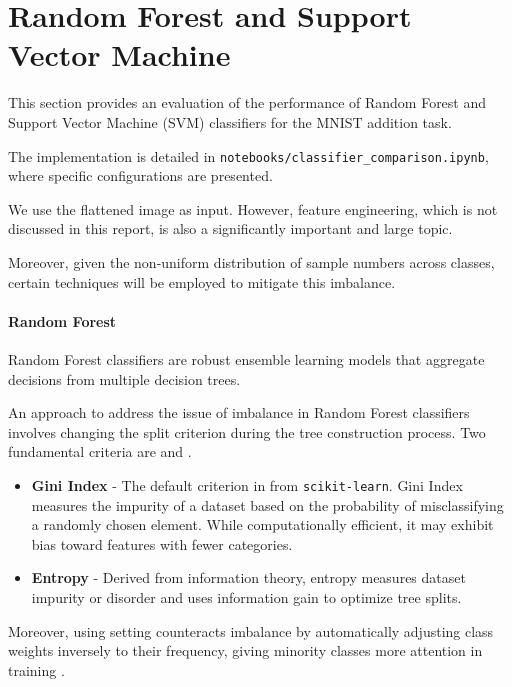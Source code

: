 \documentclass{article}
\begin{document}
\newpage

\section{Random Forest and Support Vector Machine}

This section provides an evaluation of the performance of Random Forest and Support Vector Machine (SVM) classifiers for the MNIST addition task.

The implementation is detailed in \texttt{notebooks/classifier\_comparison.ipynb}, where specific configurations are presented.

We use the flattened image as input. However, feature engineering, which is not discussed in this report, is also a significantly important and large topic. 

Moreover, given the non-uniform distribution of sample numbers across classes, certain techniques will be employed to mitigate this imbalance.

\paragraph{Random Forest}

Random Forest classifiers are robust ensemble learning models that aggregate decisions from multiple decision trees. 

An approach to address the issue of imbalance in Random Forest classifiers involves changing the split criterion during the tree construction process. Two fundamental criteria are  and .

\begin{itemize}
    \item \textbf{Gini Index} - The default criterion in  from \texttt{scikit-learn}. Gini Index measures the impurity of a dataset based on the probability of misclassifying a randomly chosen element. While computationally efficient, it may exhibit bias toward features with fewer categories.
    \item \textbf{Entropy} - Derived from information theory, entropy measures dataset impurity or disorder and uses information gain to optimize tree splits.
\end{itemize}

Moreover, using  setting counteracts imbalance by automatically adjusting class weights inversely to their frequency, giving minority classes more attention in training \cite{scikit_learn_rf_classifier}.
\end{document}
